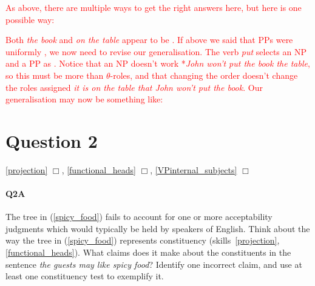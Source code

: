 \documentclass{article}
\begin{document}
\textcolor{red}{As above, there are multiple ways to get the right answers here, but here is one possible way:
\begin{exe}
\end{exe}
Both \emph{the book} and \emph{on the table} appear to be .
If above we said that PPs were uniformly , we now need to revise our generalisation.
The verb \emph{put} selects an NP  and a PP  as .
Notice that an NP  doesn't work *\emph{John won't put the book the table}, so this must be more than $\theta{}$-roles, and that changing the order doesn't change the roles assigned \emph{it is on the table that John won't put the book}.
Our generalisation may now be something like:
\begin{exe}
\end{exe}}

\section*{Question 2}
\hfill{} \ref{projection} $\Box$, \ref{functional_heads} $\Box$, \ref{VPinternal_subjects} $\Box$

\paragraph{Q2A} The tree in (\ref{spicy_food}) fails to account for one or more acceptability judgments which would typically be held by speakers of English.
Think about the way the tree in (\ref{spicy_food}) represents constituency (skills~\ref{projection}, \ref{functional_heads}).
What claims does it make about the constituents in the sentence \emph{the guests may like spicy food}? Identify one incorrect claim, and use at least one constituency test to exemplify it.
\end{document}
